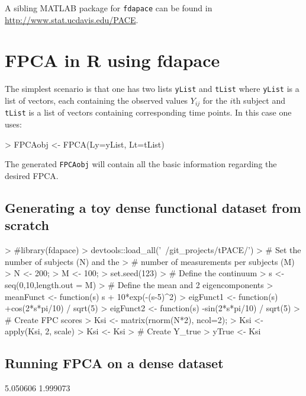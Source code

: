 \documentclass[11pt,english]{article}
\begin{document}
A sibling MATLAB package for \texttt{fdapace} can be found in \url{http://www.stat.ucdavis.edu/PACE}.
\section{FPCA in R using fdapace}

The simplest scenario is that one has two lists \texttt{yList} and \texttt{tList} where \texttt{yList} is a list of vectors, each containing the observed values $Y_{ij}$ for the $i$th subject and \texttt{tList} is a list of vectors containing corresponding time points. In this case one uses: 

\begin{Schunk}
\begin{Sinput}
> FPCAobj <- FPCA(Ly=yList, Lt=tList)
\end{Sinput}
\end{Schunk}
The generated \texttt{FPCAobj} will contain all the basic information regarding the desired FPCA.


\subsection{Generating a toy dense functional dataset from scratch}

\begin{Schunk}
\begin{Sinput}
>   #library(fdapace)
>   devtools::load_all('~/git_projects/tPACE/') 
>   # Set the number of subjects (N) and the
>   # number of measurements per subjects (M) 
>   N <- 200;   
>   M <- 100;
>   set.seed(123)
>   # Define the continuum
>   s <- seq(0,10,length.out = M)
>   # Define the mean and 2 eigencomponents
>   meanFunct <- function(s) s + 10*exp(-(s-5)^2)
>   eigFunct1 <- function(s) +cos(2*s*pi/10) / sqrt(5)
>   eigFunct2 <- function(s) -sin(2*s*pi/10) / sqrt(5)
>   # Create FPC scores
>   Ksi <- matrix(rnorm(N*2), ncol=2);
>   Ksi <- apply(Ksi, 2, scale)
>   Ksi <- Ksi %*% diag(c(5,2))
>   # Create Y_true
>   yTrue <- Ksi %*% t(matrix(c(eigFunct1(s),eigFunct2(s)), ncol=2)) + t(matrix(rep(meanFunct(s),N), nrow=M))
\end{Sinput}
\end{Schunk}

\subsection{Running FPCA on a dense dataset }

\begin{Schunk}
\begin{Soutput}
[1] 5.050606 1.999073
\end{Soutput}
\end{Schunk}
\end{document}
